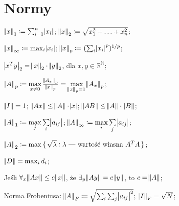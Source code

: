 \section{Normy}


\entry
$\norm{x}_1 \coloneqq \sum^n_{i=1}\abs{x_i}$;
\entry
$\norm{x}_2 \coloneqq \sqrt{x_1^2+\ldots + x_n^2}$;

\entry
$\norm{x}_\infty \coloneqq \max_{i}\abs{x_i}$;
\entry
$\norm{x}_p \coloneqq (\sum_i\abs{x_i}^p)^{1/p}$;

\entry
$\abs{x^Ty}_2=\norm{x}_2\cdot\norm{y}_2$, dla $x,y\in\mathbb{R^N}$;


\entry
$\norm{A}_p \coloneqq \max\limits_{x\neq 0} \frac{\norm{A_x}_p}{\norm{x}_p} = \max\limits_{\norm{x}_p = 1} \norm{A_x}_p$;

\entry
$\norm{I} = 1$;
\entry
$\norm{Ax} \leq \norm{A} \cdot \abs{x}$;
\entry
$\norm{AB} \leq \norm{A} \cdot \norm{B}$;

\entry
$\norm{A}_1 \coloneqq \max\limits_j\sum\limits_i\abs{a_{ij}}$;
\entry
$\norm{A}_\infty \coloneqq \max\limits_i\sum\limits_j\abs{a_{ij}}$;

\entry
$\norm{A}_2 \coloneqq \max\set{\sqrt{\lambda} : \lambda\text{ --- wartość własna } A^TA}$;

\entry
$\norm{D} = \max_i d_i$;

\entry
Jeśli $\forall_{x} \norm{Ax}\leq c\norm{x}$, że $\exists_y \norm{Ay} = c\norm{y}$, to $c=\norm{A}$;


\entry
Norma Frobeniusa: $\norm{A}_F \coloneqq \sqrt{\sum_i\sum_j\abs{a_{ij}}^2}$; $\norm{I}_F=\sqrt{N}$;


